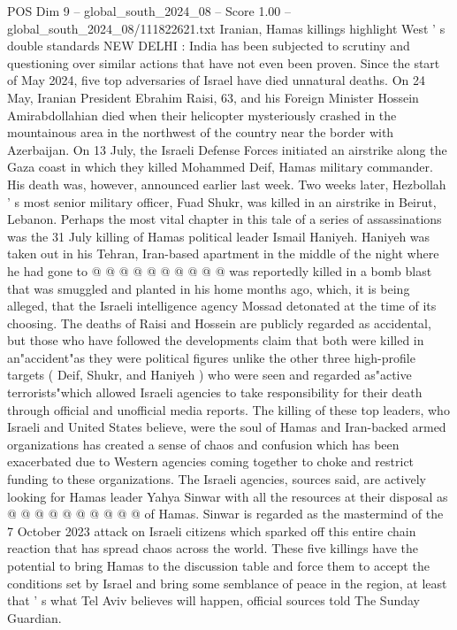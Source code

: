 \begin{textsample}{POS Dim 9 – global\_south\_2024\_08 – Score 1.00 – global\_south\_2024\_08/111822621.txt}  \label{ex:f9_pos_062}
Iranian, Hamas killings highlight West ' s double standards NEW DELHI : India has been subjected to scrutiny and questioning over similar actions that have not even been proven.
Since the start of May 2024, five top adversaries of Israel have died unnatural deaths.
On 24 May, Iranian President Ebrahim Raisi, 63, and his Foreign Minister Hossein Amirabdollahian died when their helicopter mysteriously crashed in the mountainous area in the northwest of the country near the border with Azerbaijan.
On 13 July, the Israeli Defense Forces initiated an airstrike along the Gaza coast in which they killed Mohammed Deif, Hamas military commander.
His death was, however, announced earlier last week.
Two weeks later, Hezbollah ' s most senior military officer, Fuad Shukr, was killed in an airstrike in Beirut, Lebanon.
Perhaps the most vital chapter in this tale of a series of assassinations was the 31 July killing of Hamas political leader Ismail Haniyeh.
Haniyeh was taken out in his Tehran, Iran-based apartment in the middle of the night where he had gone to @ @ @ @ @ @ @ @ @ @ was reportedly killed in a bomb blast that was smuggled and planted in his home months ago, which, it is being alleged, that the Israeli intelligence agency Mossad detonated at the time of its choosing.
The deaths of Raisi and Hossein are publicly regarded as accidental, but those who have followed the developments claim that both were killed in an"accident"as they were political figures unlike the other three high-profile targets ( Deif, Shukr, and Haniyeh ) who were seen and regarded as"active terrorists"which allowed Israeli agencies to take responsibility for their death through official and unofficial media reports.
The killing of these top leaders, who Israeli and United States believe, were the soul of Hamas and Iran-backed armed organizations has created a sense of chaos and confusion which has been exacerbated due to Western agencies coming together to choke and restrict funding to these organizations.
The Israeli agencies, sources said, are actively looking for Hamas leader Yahya Sinwar with all the resources at their disposal as @ @ @ @ @ @ @ @ @ @ of Hamas.
Sinwar is regarded as the mastermind of the 7 October 2023 attack on Israeli citizens which sparked off this entire chain reaction that has spread chaos across the world.
These five killings have the potential to bring Hamas to the discussion table and force them to accept the conditions set by Israel and bring some semblance of peace in the region, at least that ' s what Tel Aviv believes will happen, official sources told The Sunday Guardian.

\end{textsample}
